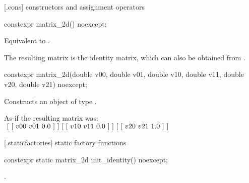  [\matrixtwod.cons] { constructors and assignment operators}

\begin{itemdecl}
constexpr matrix_2d() noexcept;
\end{itemdecl}
\begin{itemdescr}
\pnum
\effects
Equivalent to .

\pnum
\begin{note}
The resulting matrix is the identity matrix, which can also be obtained from .
\end{note}
\end{itemdescr}

\begin{itemdecl}
constexpr matrix_2d(double v00, double v01, double v10, double v11,
  double v20, double v21) noexcept;
\end{itemdecl}
\begin{itemdescr}
\pnum
\effects
Constructs an object of type .

\pnum
As-if the resulting matrix was: \\
$
~[~[~v00~v01~0.0~]~] \\
~[~[~v10~v11~0.0~]~] \\
~[~[~v20~v21~1.0~]~]$

%
%
%
%
%
\end{itemdescr}

 [\matrixtwod.staticfactories] { static factory 
functions}

\begin{itemdecl}
constexpr static matrix_2d init_identity() noexcept;
\end{itemdecl}
\begin{itemdescr}
\pnum
\returns
{}.
\end{itemdescr}

